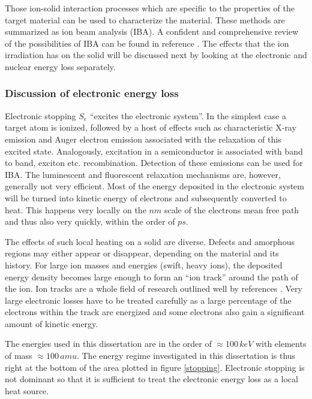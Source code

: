 Those ion-solid interaction processes which are specific to the properties of the target material can be used to characterize the material. These methods are summarized as ion beam analysis (IBA). A confident and comprehensive review of the possibilities of IBA can be found in reference \cite{jeynes_total_2012}. The effects that the ion irradiation has on the solid will be discussed next by looking at the electronic and nuclear energy loss separately. 

\subsubsection{Discussion of electronic energy loss}


Electronic stopping $S_e$ ``excites the electronic system''. In the simplest case a target atom is ionized, followed by a host of effects such as characteristic X-ray emission and Auger electron emission associated with the relaxation of this excited state. Analogously, excitation in a semiconductor is associated with band to band, exciton etc. recombination. Detection of these emissions can be used for IBA. The luminescent and fluorescent relaxation mechanisms are, however, generally not very efficient. Most of the energy deposited in the electronic system will be turned into kinetic energy of electrons and subsequently converted to heat. This happens very locally on the $nm$ scale of the electrons mean free path and thus also very quickly, within the order of $ps$. 

The effects of such local heating on a solid are diverse. Defects and amorphous regions may either appear or disappear, depending on the material and its history. For large ion masses and energies (swift, heavy ions), the deposited energy density becomes large enough to form an ``ion track'' around the path of the ion. Ion tracks are a whole field of research outlined well by references \cite{toulemonde_transient_1992,miotello_revisiting_1997,wesch_effect_2004}. Very large electronic losses have to be treated carefully as a large percentage of the electrons within the track are energized and some electrons also gain a significant amount of kinetic energy. 

The energies used in this dissertation are in the order of $\approx 100\,keV$ with elements of mass $\approx 100\,amu$. The energy regime investigated in this dissertation is thus right at the bottom of the area plotted in figure \ref{stopping}. Electronic stopping is not dominant so that it is sufficient to treat the electronic energy loss as a local heat source.

